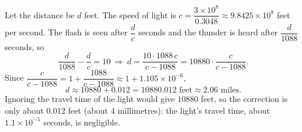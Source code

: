 Let the distance be $d$ feet. The speed of light is $c=\dfrac{3\times10^8}{0.3048}\approx9.8425\times10^8$ feet per second. The flash is seen after $\dfrac {d}{c}$ seconds and the thunder is heard after $\dfrac{d}{1088}$ seconds, so
\[
\dfrac{d}{1088}-\dfrac {d}{c}=10\ \Longrightarrow\ d=\dfrac{10\cdot1088\,c}{c-1088}=10880\cdot\dfrac{c}{c-1088}.
\]
Since $\dfrac{c}{c-1088}=1+\dfrac{1088}{c-1088}\approx1+1.105\times10^{-6}$,
\[
d\approx10880+0.012=\boxed{10880.012\text{ feet}\approx2.06\text{ miles}}.
\]
Ignoring the travel time of the light would give $10880$ feet, so the correction is only about $0.012$ feet (about $4$ millimetres): the light's travel time, about $1.1\times10^{-5}$ seconds, is negligible.
